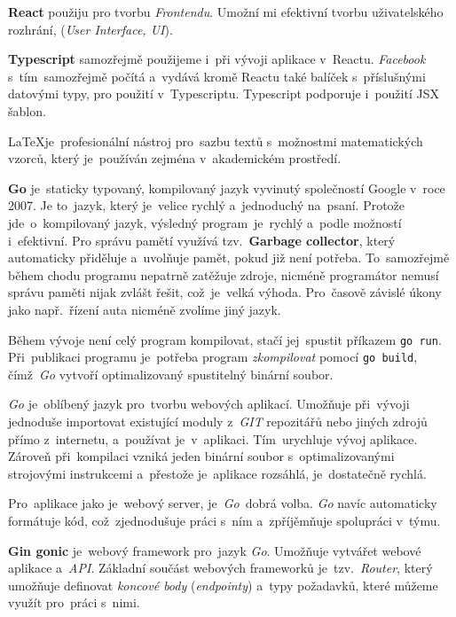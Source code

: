 \documentclass[11pt,a4paper]{report}
\begin{document}
            \textbf{React} použiju pro tvorbu \emph{Frontendu}. Umožní mi efektivní tvorbu uživatelského rozhrání, (\emph{User Interface, UI}).

            \textbf{Typescript} samozřejmě použijeme i~při vývoji aplikace v~Reactu. \emph{Facebook} s~tím~samozřejmě počítá a~vydává
            kromě Reactu také balíček s~příslušnými datovými typy, pro použití v~Typescriptu. Typescript podporuje i~použití JSX šablon. \cite[Refeerence/Handbook/JSX]{TypeScript}

            \LaTeX je~profesionální nástroj pro~sazbu textů s~možnostmi matematických vzorců, který je~používán zejména v~akademickém prostředí.\cite{Rybicka2003:latex}

            \textbf{Go} je~staticky typovaný, kompilovaný jazyk vyvinutý společností Google v~roce 2007. Je to~jazyk, který je~velice rychlý a~jednoduchý na~psaní. Protože jde~o~kompilovaný jazyk, výsledný program~je~rychlý a~podle možností i~efektivní. Pro správu pamětí využívá tzv.~\textbf{Garbage collector}, který automaticky přiděluje a~uvolňuje pamět, pokud již není potřeba. To~samozřejmě během chodu programu nepatrně zatěžuje zdroje, nicméně programátor nemusí správu paměti nijak zvlášt řešit, což~je~velká výhoda. Pro~časově závislé úkony jako např.~řízení auta nicméně zvolíme jiný jazyk. \cite[7.5]{compilers}
            
            Během vývoje není celý program kompilovat, stačí jej~spustit příkazem \texttt{go run}. Při~publikaci programu je~potřeba program \emph{zkompilovat} pomocí \texttt{go build}, čímž~\emph{Go} vytvoří optimalizovaný spustitelný binární soubor.
            
            \emph{Go} je~oblíbený jazyk pro~tvorbu webových aplikací. Umožňuje při~vývoji jednoduše importovat existující moduly z~\emph{GIT} repozitářů nebo jiných zdrojů přímo z~internetu, a~používat je~v~aplikaci. Tím~urychluje vývoj aplikace. Zároveň při~kompilaci vzniká jeden binární soubor s~optimalizovanými strojovými instrukcemi a~přestože je~aplikace rozsáhlá, je~dostatečně rychlá.
            
            Pro~aplikace jako je~webový server, je~\emph{Go}~dobrá volba. \emph{Go} navíc automaticky formátuje kód, což~zjednodušuje práci s~ním a~zpříjěmňuje spolupráci v~týmu.

            \textbf{Gin gonic} je~webový framework pro~jazyk \emph{Go}. Umožňuje vytvářet webové aplikace a~\emph{API}. Základní součást webových frameworků je~tzv.~\emph{Router}, který umožňuje definovat \emph{koncové body} (\emph{endpointy}) a~typy požadavků, které můžeme využít pro~práci s~nimi.
            
\end{document}
